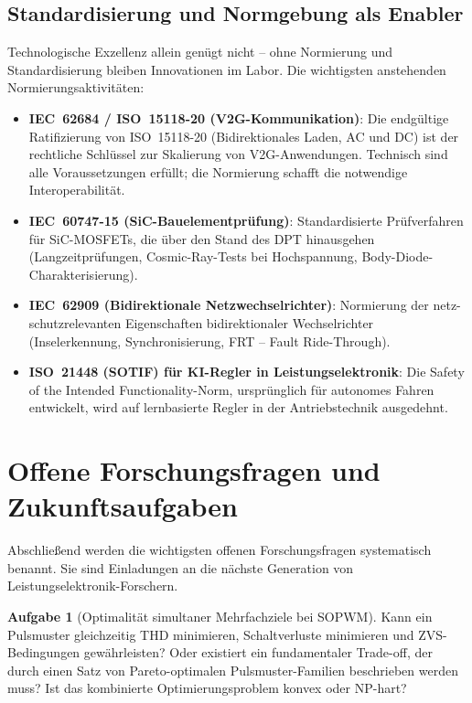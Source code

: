 ﻿\documentclass[a4paper,12pt,openany,oneside]{book}
\newcommand{\abschnitt}[1]{\section{#1}}
\newcommand{\unterabschnitt}[1]{\subsection{#1}}
\theoremstyle{definition}
\newtheorem{aufgabe}{Aufgabe}[chapter]
\begin{document}
\unterabschnitt{Standardisierung und Normgebung als Enabler}

Technologische Exzellenz allein gen\"ugt nicht -- ohne Normierung und Standardisierung
bleiben Innovationen im Labor. Die wichtigsten anstehenden Normierungsaktivit\"aten:

\begin{itemize}
  \item \textbf{IEC~62684 / ISO~15118-20 (V2G-Kommunikation)}: Die endg\"ultige Ratifizierung
    von ISO~15118-20 (Bidirektionales Laden, AC und DC) ist der rechtliche Schl\"ussel
    zur Skalierung von V2G-Anwendungen. Technisch sind alle Voraussetzungen erf\"ullt;
    die Normierung schafft die notwendige Interoperabilit\"at.
  \item \textbf{IEC~60747-15 (SiC-Bauelementpr\"ufung)}: Standardisierte Pr\"ufverfahren
    f\"ur SiC-MOSFETs, die \"uber den Stand des DPT hinausgehen (Langzeitpr\"ufungen,
    Cosmic-Ray-Tests bei Hochspannung, Body-Diode-Charakterisierung).
  \item \textbf{IEC~62909 (Bidirektionale Netzwechselrichter)}: Normierung der netz-
    schutzrelevanten Eigenschaften bidirektionaler Wechselrichter (Inselerkennung,
    Synchronisierung, FRT -- Fault Ride-Through).
  \item \textbf{ISO~21448 (SOTIF) f\"ur KI-Regler in Leistungselektronik}: Die Safety
    of the Intended Functionality-Norm, urspr\"unglich f\"ur autonomes Fahren entwickelt,
    wird auf lernbasierte Regler in der Antriebstechnik ausgedehnt.
\end{itemize}

\abschnitt{Offene Forschungsfragen und Zukunftsaufgaben}

Abschlie\ss{}end werden die wichtigsten offenen Forschungsfragen systematisch benannt.
Sie sind Einladungen an die n\"achste Generation von Leistungselektronik-Forschern.

\begin{aufgabe}[Optimalit\"at simultaner Mehrfachziele bei SOPWM]
  Kann ein Pulsmuster gleichzeitig THD minimieren, Schaltverluste minimieren und
  ZVS-Bedingungen gew\"ahrleisten? Oder existiert ein fundamentaler Trade-off, der
  durch einen Satz von Pareto-optimalen Pulsmuster-Familien beschrieben werden muss?
  Ist das kombinierte Optimierungsproblem konvex oder NP-hart?
\end{aufgabe}
\end{document}
